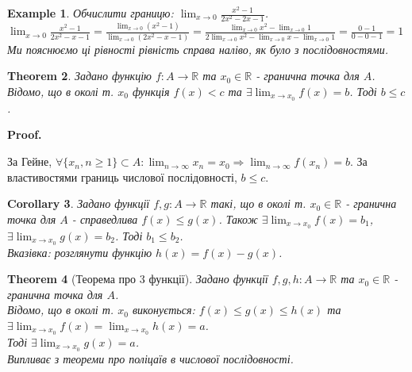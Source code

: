 \documentclass[a4paper, 14pt]{article}
\makeatletter
\def\qed{$\blacksquare$}
\theoremstyle{theoremdd}
\newtheorem{theorem}{Theorem}[subsection]
\theoremstyle{theoremdd}
\theoremstyle{theoremdd}
\theoremstyle{theoremdd}
\newtheorem{example}[theorem]{Example}
\theoremstyle{theoremdd}
\theoremstyle{theoremdd}
\theoremstyle{theoremdd}
\theoremstyle{theoremdd}
\newtheorem{corollary}[theorem]{Corollary}
\renewenvironment{proof}[1][Proof.\\]{\par
\pushQED{\hfill \qed}%
\normalfont \topsep6\p@\@plus6\p@\relax
\trivlist
\item\relax
{\bfseries
#1\@addpunct{.}}\hspace\labelsep\ignorespaces
}{%
\popQED\endtrivlist\@endpefalse
}
\makeatother
\begin{document}
	\begin{example}
	Обчислити границю: $\displaystyle \lim_{x \to 0} \frac{x^2-1}{2x^2-2x-1}$.\\
	$\displaystyle \lim_{x \to 0} \frac{x^2-1}{2x^2-x-1} = \frac{\displaystyle \lim_{x \to 0} (x^2-1)}{\displaystyle \lim_{x \to 0}(2x^2-x-1)} = \frac{\displaystyle \lim_{x \to 0}x^2 - \lim_{x \to 0}1}{\displaystyle 2\lim_{x \to 0}x^2 - \lim_{x \to 0}x - \lim_{x \to 0}1} = \frac{0-1}{0-0-1} = 1$\\
	Ми пояснюємо ці рівності рівність справа наліво, як було з послідовностями.
	\end{example}
	
	\begin{theorem}
	Задано функцію $f: A\to \mathbb{R}$ та $x_0 \in \mathbb{R}$ - гранична точка для $A$.\\
Відомо, що в околі т. $x_0$ функція $f(x) < c$ та $\exists \displaystyle \lim_{x \to x_0} f(x) = b$. Тоді $b \leq c$.
	\end{theorem}

	\begin{proof}
За Гейне, $\displaystyle \forall \{x_n, n \geq 1\} \subset A:  \lim_{n \to \infty} x_n = x_0 \Rightarrow \lim_{n \to \infty} f(x_n) = b$. За властивостями границь числової послідовності, $b \leq c$.
	\end{proof}
	
	\begin{corollary}
	Задано функції $f,g: A \to \mathbb{R}$ такі, що в околі т. $x_0 \in \mathbb{R}$ - гранична точка для $A$ - справедлива $f(x) \leq g(x)$. Також $\exists \displaystyle \lim_{x \to x_0} f(x) = b_1$, $\exists \displaystyle \lim_{x \to x_0} g(x) = b_2$. Тоді $b_1 \leq b_2$.\\
\textit{Вказівка: розглянути функцію} $h(x) = f(x) - g(x)$.
	\end{corollary}
	
	\begin{theorem}[Теорема про 3 функції]
Задано функції $f,g,h: A \to \mathbb{R}$ та $x_0 \in \mathbb{R}$ - гранична точка для $A$.\\
Відомо, що в околі т. $x_0$ виконується: $f(x) \leq g(x) \leq h(x)$ та $\exists \displaystyle \lim_{x \to x_0} f(x) = \lim_{x \to x_0} h(x) = a$.\\
Тоді $\exists \displaystyle \lim_{x \to x_0} g(x) = a$.\\
\textit{Випливає з теореми про поліцаїв в числової послідовності.}
	\end{theorem}
	
\end{document}
